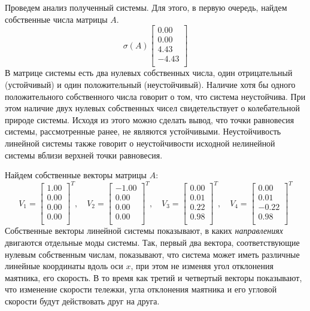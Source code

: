 Проведем анализ полученный системы. Для этого, в первую очередь, найдем собственные числа матрицы $A$. 
\begin{equation}
    \sigma(A) \begin{bmatrix}
        0.00 \\ 
        0.00 \\ 
        4.43 \\ 
        -4.43 \\  
    \end{bmatrix}
\end{equation}
В матрице системы есть два нулевых собственных числа, один отрицательный (устойчивый) и один положительный (неустойчивый). 
Наличие хотя бы одного положительного собственного числа говорит о том, что система неустойчива. При этом 
наличие двух нулевых собственных чисел свидетельствует о колебательной природе системы. Исходя из этого можно сделать вывод,
что точки равновесия системы, рассмотренные ранее, не являются устойчивыми. Неустойчивость линейной системы также говорит 
о неустойчивости исходной нелинейной системы вблизи верхней точки равновесия. 

Найдем собственные векторы матрицы $A$:
\begin{equation}
    V_1 = \begin{bmatrix}
    1.00  \\ 0.00  \\ 0.00 \\ 0.00 \\
    \end{bmatrix}^T,\quad
    V_2 = \begin{bmatrix}
    -1.00 \\ 0.00 \\ 0.00 \\ 0.00 \\
    \end{bmatrix}^T,\quad
    V_3 = \begin{bmatrix}
    0.00 \\ 0.01 \\ 0.22 \\ 0.98 \\
    \end{bmatrix}^T,\quad
    V_4 = \begin{bmatrix}
    0.00  \\ 0.01  \\ -0.22 \\ 0.98 \\
    \end{bmatrix}^T
    \label{eq:eigenvectors}
\end{equation}
Собственные векторы линейной системы показывают, в каких \textit{направлениях} двигаются отдельные моды системы. 
Так, первый два вектора, соответствующие нулевым собственным числам, показывают, что система может иметь различные
линейные координаты вдоль оси $x$, при этом не изменяя угол отклонения маятника, его скорость. В то время как третий и четвертый
векторы показывают, что изменение скорости тележки, угла отклонения маятника и его угловой скорости будут действовать 
друг на друга. 

